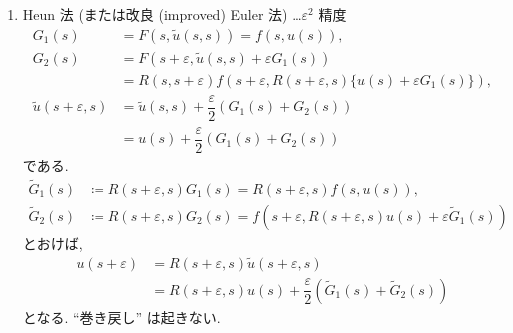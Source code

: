 \documentclass[12pt, a4j]{jsarticle}
\newcommand{\e}{\varepsilon}
\begin{document}
\begin{enumerate}[label=(\arabic{*})]
 \item Heun 法 (または改良 (improved) Euler 法) \dots $\e^{2}$ 精度
       \begin{align}
	G_{1}(s) 
	&= F(s, \tilde{u}(s, s))
	 = f(s, u(s)), \\
	G_{2}(s) 
	&= F(s + \e, \tilde{u}(s, s) + \e G_{1}(s))
	\\
	&= R(s, s + \e)
	   f(s + \e,
	     R(s + \e, s) \{ u(s) + \e G_{1}(s) \} ), \\
	\tilde{u}(s + \e, s)
	&= \tilde{u}(s, s)
	   + \dfrac{\e}{2}(G_{1}(s) + G_{2}(s))
	\\
	&= u(s) + \dfrac{\e}{2}(G_{1}(s) + G_{2}(s))
       \end{align}
       である.
       \begin{align}
	\tilde{G}_{1}(s)
	&\coloneqq R(s + \e, s) G_{1}(s)
	= R(s + \e, s) f(s, u(s)),
	\\
	\tilde{G}_{2}(s)
	&\coloneqq R(s + \e, s) G_{2}(s)
	= f(s + \e, R(s + \e, s) u(s)+ \e \tilde{G}_{1}(s))
       \end{align}
       とおけば,
       \begin{align}
	u(s + \e)
	&= R(s + \e, s) \tilde{u}(s + \e, s)
	\\
	&= R(s + \e, s) u(s)
	   + \dfrac{\e}{2}
	   (\tilde{G}_{1}(s) + \tilde{G}_{2}(s))
       \end{align}
       となる. ``巻き戻し'' は起きない.



\end{enumerate}
\end{document}
